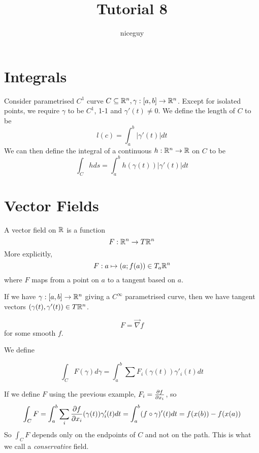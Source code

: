 \documentclass[12pt]{article}
\title{Tutorial 8}
\author{niceguy}
\begin{document}
\maketitle

\section{Integrals}

Consider parametrised $C^1$ curve $C \subseteq \mathbb{R}^n, \gamma:[a,b] \rightarrow \mathbb{R}^n$. Except for isolated points, we require $\gamma$ to be $C^1$, 1-1 and $\gamma'(t) \ne 0$. We define the length of $C$ to be
$$l(c) = \int_a^b |\gamma'(t)|dt$$
We can then define the integral of a continuous $h: \mathbb{R}^n \rightarrow \mathbb{R}$ on $C$ to be
$$\int_C hds = \int_a^b h(\gamma(t))|\gamma'(t)|dt$$

\section{Vector Fields}

\begin{defn}
    A vector field on $\mathbb{R}$ is a function
    $$F: \mathbb{R}^n \rightarrow T\mathbb{R}^n$$
    More explicitly,
    $$F: a \mapsto (a; f(a)) \in T_a\mathbb{R}^n$$
    where $F$ maps from a point on $a$ to a tangent based on $a$.
\end{defn}

\begin{ex}
If we have $\gamma:[a,b] \rightarrow \mathbb{R}^n$ giving a $C^\infty$ parametrised curve, then we have tangent vectors $(\gamma(t), \gamma'(t)) \in T\mathbb{R}^n$.
\end{ex}

\begin{ex}
    $$F = \vec\nabla f$$
    for some smooth $f$.
\end{ex}

We define

$$\int_C F(\gamma)d\gamma = \int_a^b \sum F_i(\gamma(t))\gamma'_i(t)dt$$

If we define $F$ using the previous example, $F_i = \frac{\partial f}{\partial x_i}$, so
$$\int_C F = \int_a^b \sum_i \frac{\partial f}{\partial x_i}(\gamma(t)) \gamma'_i(t)dt = \int_a^b (f\circ\gamma)'(t) dt = f(x(b)) - f(x(a))$$
So $\int_C F$ depends only on the endpoints of $C$ and not on the path. This is what we call a \textit{conservative} field.
\end{document}
